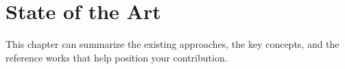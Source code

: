 \chapter{State of the Art}

This chapter can summarize the existing approaches, the key concepts, and the
reference works that help position your contribution.
